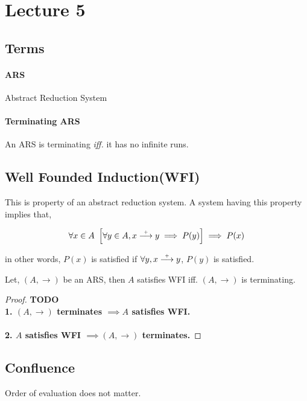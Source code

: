 \section{Lecture 5}

\subsection{Terms}

\paragraph{ARS} Abstract Reduction System

\paragraph{Terminating ARS} An ARS is terminating \emph{iff.} it has no infinite runs.

\subsection{Well Founded Induction(WFI)}

This is property of an abstract reduction system. A system having this property implies that,

$$
\forall x \in A \ \left[ \forall y \in A, x \stackrel{\scriptscriptstyle\!+\!}\longrightarrow y \implies P(y) \right] \implies P(x)
$$

in other words,
$P(x)$ is satisfied if $\forall y, x \stackrel{\scriptscriptstyle\!+\!}\longrightarrow y$, $P(y)$ is satisfied.

\begin{theorem}
    Let, $(A, \longrightarrow)$ be an ARS, then $A$ satisfies WFI iff. $(A, \longrightarrow)$ is terminating.
\end{theorem}

\begin{proof}
    \textbf{TODO}
    \text{} \\
    \textbf{1. $(A, \longrightarrow)$ terminates $\implies A$ satisfies WFI.} \\
    \\
    \textbf{2. $A$ satisfies WFI $\implies (A, \longrightarrow)$ terminates.}
\end{proof}

\subsection{Confluence}

Order of evaluation does not matter.

